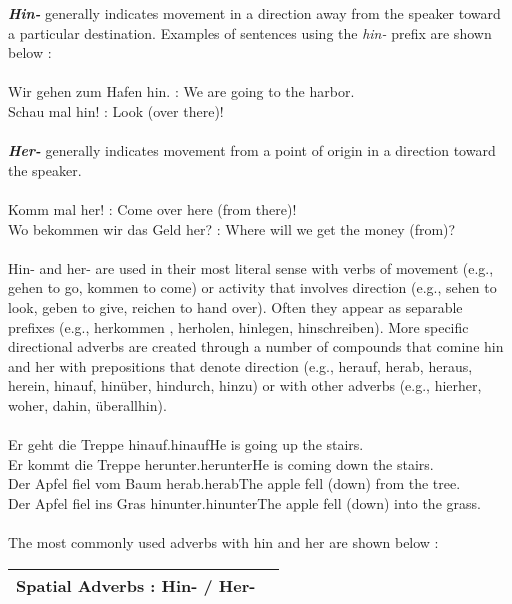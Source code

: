 \documentclass[a4paper,12pt]{article}
\begin{document}
\begin{adjustwidth}{2em}{0pt}
\begin{adjustwidth}{3em}{0pt}
\textbf{\textit{Hin-}} generally indicates movement in a direction away from the speaker toward a
particular destination. Examples of sentences using the \textit{hin-} prefix are
shown below :
\\\\
\noindent
Wir gehen zum Hafen hin. : We are going to the harbor.\\
Schau mal hin!           : Look (over there)!
\\\\
\textbf{\textit{Her-}} generally indicates movement from a point of origin in a direction toward
the speaker.
\\\\
\noindent
Komm mal her!                 : Come over here (from there)!\\
Wo bekommen wir das Geld her? : Where will we get the money (from)?
\\\\
Hin- and her- are used in their most literal sense with verbs of movement (e.g.,
gehen to go, kommen to come) or activity that involves direction (e.g., sehen to
look, geben to give, reichen to hand over). Often they appear as separable
prefixes (e.g., herkommen , herholen, hinlegen, hinschreiben). More specific
directional adverbs are created through a number of compounds that comine hin
and her with prepositions that denote direction (e.g., herauf, herab, heraus,
herein, hinauf, hinüber, hindurch, hinzu) or with other adverbs (e.g., hierher,
woher, dahin, überallhin).
\\\\
\noindent
Er geht die Treppe hinauf.hinaufHe is going up the stairs.\\
Er kommt die Treppe herunter.herunterHe is coming down the stairs.\\
Der Apfel fiel vom Baum herab.herabThe apple fell (down) from the tree.\\
Der Apfel fiel ins Gras hinunter.hinunterThe apple fell (down) into the grass.
\\\\
\noindent
The most commonly used adverbs with hin and her are shown below :


\begin{minipage}{.5\linewidth}
\vspace{0.3cm}
\begin{tabular}{l|l}
\toprule
\rowcolor{goethe_green}
\multicolumn{2}{c}
{\color{white} \textbf{Spatial Adverbs : Hin- / Her-} \color{black}} \\
\midrule


\end{tabular}
\end{minipage}
\end{adjustwidth}
\end{adjustwidth}
\end{document}
